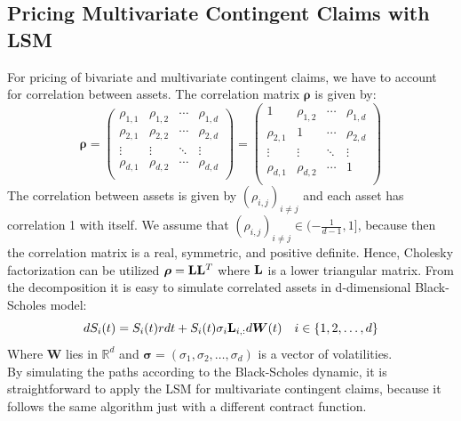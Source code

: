 \subsection{Pricing Multivariate Contingent Claims with LSM}\label{LSMExtension}
For pricing of bivariate and multivariate contingent claims, we have to account for correlation between assets. The correlation matrix $\bm{\rho}$ is given by:
\begin{equation*}
\bm{\rho} = \begin{pmatrix}
\rho_{1,1} & \rho_{1,2} & \cdots & \rho_{1,d} \\
\rho_{2,1} & \rho_{2,2} & \cdots & \rho_{2,d} \\
\vdots & \vdots & \ddots & \vdots \\
\rho_{d,1} & \rho_{d,2} & \cdots & \rho_{d,d} \\
\end{pmatrix} = \begin{pmatrix}
1 & \rho_{1,2} & \cdots & \rho_{1,d} \\
\rho_{2,1} & 1 & \cdots & \rho_{2,d} \\
\vdots & \vdots & \ddots & \vdots \\
\rho_{d,1} & \rho_{d,2} & \cdots & 1 \\
\end{pmatrix}
\end{equation*}
The correlation between assets is given by $(\rho_{i,j})_{i\neq j}$ and each asset has correlation 1 with itself. We assume that $(\rho_{i,j})_{i \neq j} \in (-\frac{1}{d-1},1]$, because then the correlation matrix is a real, symmetric, and positive definite. Hence, Cholesky factorization can be utilized $\bm{\rho}=\mathbf{L}\mathbf{L}^T$ where $\mathbf{L}$ is a lower triangular matrix. From the decomposition it is easy to simulate correlated assets in d-dimensional Black-Scholes model:
\begin{equation*}
dS_{i}(t)=S_{i}(t) r dt + S_{i}(t) \sigma_i \mathbf{L}_{i,:} d\bm{W}(t) \quad i \in \{1,2,\ldots, d\}
\end{equation*}
Where $\bm{W}$ lies in $\mathbb{R}^d$ and $\bm{\sigma}=(\sigma_1, \sigma_2, \ldots, \sigma_d)$ is a vector of volatilities.\\

By simulating the paths according to the Black-Scholes dynamic, it is straightforward to apply the LSM for multivariate contingent claims, because it follows the same algorithm just with a different contract function.\\


